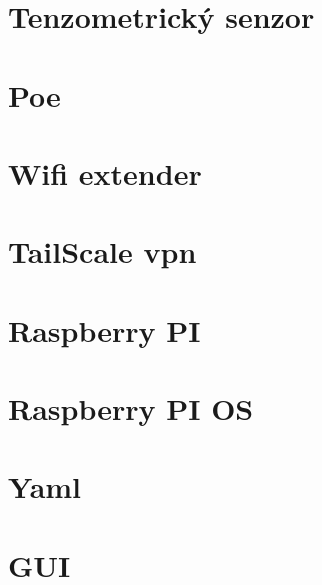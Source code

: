 \section{Tenzometrický senzor}
\section{Poe}
\section{Wifi extender}
\section{TailScale vpn}
\section{Raspberry PI}
\section{Raspberry PI OS}
\section{Yaml}
\section{GUI}




